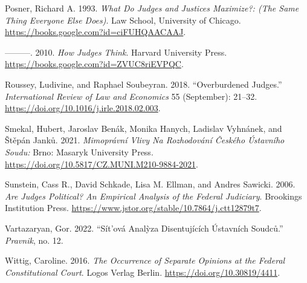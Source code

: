 \documentclass[
  11pt,
]{article}
\newlength{\cslhangindent}
\newenvironment{CSLReferences}[2] %
 {%
  \setlength{\parindent}{0pt}
  \ifodd #1 \everypar{\setlength{\hangindent}{\cslhangindent}}\ignorespaces\fi
  \ifnum #2 > 0
  \setlength{\parskip}{#2\baselineskip}
  \fi
 }%
 {}
\begin{document}
\begin{CSLReferences}{1}{0}
\leavevmode{}%
Posner, Richard A. 1993. \emph{What {Do Judges} and {Justices
Maximize}?: (The {Same Thing Everyone Else Does})}. {Law School,
University of Chicago}. \url{https://books.google.com?id=ciFUHQAACAAJ}.

\leavevmode{}%
---------. 2010. \emph{How {Judges Think}}. {Harvard University Press}.
\url{https://books.google.com?id=ZVUC8riEVPQC}.

\leavevmode{}%
Roussey, Ludivine, and Raphael Soubeyran. 2018. {``Overburdened
Judges.''} \emph{International Review of Law and Economics} 55
(September): 21--32. \url{https://doi.org/10.1016/j.irle.2018.02.003}.

\leavevmode{}%
Smekal, Hubert, Jaroslav Benák, Monika Hanych, Ladislav Vyhnánek, and
Štěpán Janků. 2021. \emph{Mimoprávní Vlivy Na Rozhodování Českého
{Ústavního} Soudu:} {Brno}: {Masaryk University Press}.
\url{https://doi.org/10.5817/CZ.MUNI.M210-9884-2021}.

\leavevmode{}%
Sunstein, Cass R., David Schkade, Lisa M. Ellman, and Andres Sawicki.
2006. \emph{Are {Judges Political}? {An Empirical Analysis} of the
{Federal Judiciary}}. {Brookings Institution Press}.
\url{https://www.jstor.org/stable/10.7864/j.ctt12879t7}.

\leavevmode{}%
Vartazaryan, Gor. 2022. {``Sít'ová Analỳza Disentujících Ústavních
Soudců.''} \emph{Pravnik}, no. 12.

\leavevmode{}%
Wittig, Caroline. 2016. \emph{The {Occurrence} of {Separate Opinions} at
the {Federal Constitutional Court}}. {Logos Verlag Berlin}.
\url{https://doi.org/10.30819/4411}.

\end{CSLReferences}
\end{document}
